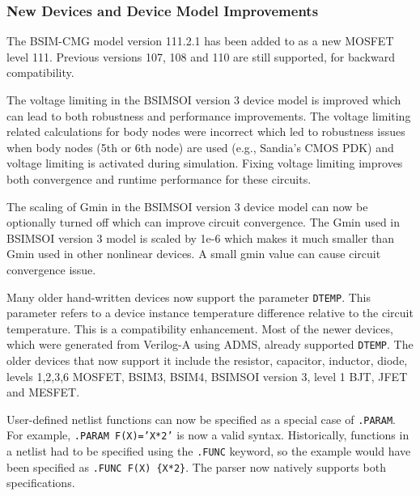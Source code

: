 \documentclass[letterpaper]{scrartcl}
\begin{document}
\subsubsection*{New Devices and Device Model Improvements}
\begin{XyceItemize}

\item The BSIM-CMG model version 111.2.1 has been added to \Xyce{} as a new MOSFET level 111.  Previous versions 107, 108 and 110 are still supported, for backward compatibility.

\item The voltage limiting in the BSIMSOI version 3 device model is
improved which can lead to both robustness and performance improvements.
The voltage limiting related calculations for body nodes were incorrect 
which led to robustness issues when body nodes (5th or 6th node) are
used (e.g., Sandia's CMOS PDK) and voltage limiting is activated during
simulation. Fixing voltage limiting improves both convergence
and runtime performance for these circuits.

\item The scaling of Gmin in the BSIMSOI version 3 device model can now
be optionally turned off which can improve circuit convergence. The Gmin
used in BSIMSOI version 3 model is scaled by 1e-6 which makes it much smaller than
Gmin used in other nonlinear devices. A small gmin value can cause circuit
convergence issue.

\item Many older hand-written devices now support the parameter \texttt{DTEMP}.  This 
parameter refers to a device instance temperature difference relative to the 
circuit temperature.  This is a compatibility enhancement.  Most of the newer devices,
which were generated from Verilog-A using ADMS, already supported \texttt{DTEMP}.  
The older devices that now support it include the resistor, capacitor, 
inductor, diode, levels 1,2,3,6 MOSFET, BSIM3, BSIM4, BSIMSOI version 3, level 1 BJT, 
JFET and MESFET.

\item User-defined netlist functions can now be specified as a special 
case of \texttt{.PARAM}.  For example, \texttt{.PARAM F(X)='X*2'} is now a 
valid \Xyce{} syntax.  Historically, functions in a \Xyce{} netlist had 
to be specified using the \texttt{.FUNC} keyword, so the example would have 
been specified as \texttt{.FUNC F(X) \{X*2\}}.
The parser now natively supports both specifications.   

\end{XyceItemize}
\end{document}
